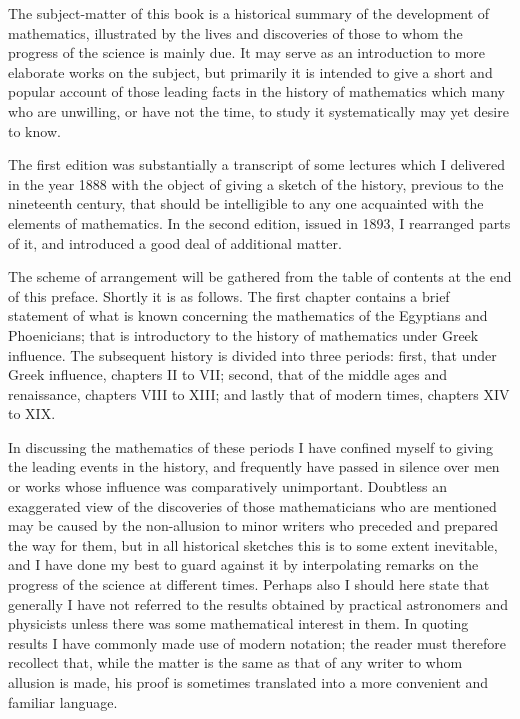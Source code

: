 \documentclass[12pt,oneside]{book}
\begin{document}
The subject-matter of this book is a historical summary of the development of mathematics, illustrated by the lives and discoveries of those to
whom the progress of the science is mainly due. It may serve as an introduction to more elaborate works on the subject, but primarily it is intended
to give a short and popular account of those leading facts in the history of mathematics which many who are unwilling, or have not the time, to study
it systematically may yet desire to know. 

The first edition was substantially a transcript of some lectures which I delivered in the year 1888 with the object of giving a sketch of the history,
previous to the nineteenth century, that should be intelligible to any one acquainted with the elements of mathematics. In the second edition, issued in 
1893, I rearranged parts of it, and introduced a good deal of additional matter. \par 

The scheme of arrangement will be gathered from the table of contents at the end of this preface. Shortly it is as follows. The first chapter contains
a brief statement of what is known concerning the mathematics of the Egyptians and Phoenicians; that is introductory to the history of mathematics
under Greek influence. The subsequent history is divided into three periods: first, that under Greek influence, chapters II to VII; second, that of 
the middle ages and renaissance, chapters VIII to XIII; and lastly that of modern times, chapters XIV to XIX. \par 

In discussing the mathematics of these periods I have confined myself to giving the leading events in the history, and frequently have passed in silence 
over men or works whose influence was comparatively unimportant. Doubtless an exaggerated view of the discoveries of those mathematicians who are mentioned 
may be caused by the non-allusion to minor writers who preceded and prepared the way for them, but in all historical sketches this is to some extent inevitable,
and I have done my best to guard against it by interpolating remarks on the progress of the science at different times. Perhaps also I should here state that
generally I have not referred to the results obtained by practical astronomers and physicists unless there was some mathematical interest in them.
In quoting results I have commonly made use of modern notation; the reader must therefore recollect that, while the matter is the same as that of any writer
to whom allusion is made, his proof is sometimes translated into a more convenient and familiar language. \par 
\end{document}
